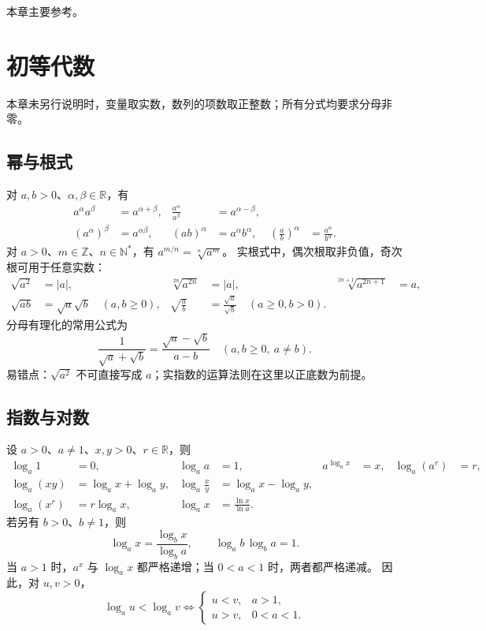 \documentclass[../main.tex]{subfiles}
\begin{document}
本章主要参考\cite{openstax,hlp}。

\section{初等代数}
本章未另行说明时，变量取实数，数列的项数取正整数；所有分式均要求分母非零。
\subsection{幂与根式}
对 $a,b>0$、$\alpha,\beta\in\mathbb R$，有
\begin{align*}
a^\alpha a^\beta&=a^{\alpha+\beta}, &
\frac{a^\alpha}{a^\beta}&=a^{\alpha-\beta},\\
(a^\alpha)^\beta&=a^{\alpha\beta}, &
(ab)^\alpha&=a^\alpha b^\alpha, &
\left(\frac ab\right)^\alpha&=\frac{a^\alpha}{b^\alpha}.
\end{align*}
对 $a>0$、$m\in\mathbb Z$、$n\in\mathbb N^*$，有 $a^{m/n}=\sqrt[n]{a^m}$。
实根式中，偶次根取非负值，奇次根可用于任意实数：
\begin{align*}
\sqrt{a^2}&=|a|, & \sqrt[2n]{a^{2n}}&=|a|, &
\sqrt[2n+1]{a^{2n+1}}&=a,\\
\sqrt{ab}&=\sqrt a\sqrt b\quad(a,b\ge0), &
\sqrt{\frac ab}&=\frac{\sqrt a}{\sqrt b}\quad(a\ge0,b>0).
\end{align*}
分母有理化的常用公式为
\[
\frac1{\sqrt a+\sqrt b}=\frac{\sqrt a-\sqrt b}{a-b}
\quad(a,b\ge0,\ a\ne b).
\]
易错点：$\sqrt{a^2}$ 不可直接写成 $a$；实指数的运算法则在这里以正底数为前提。
\subsection{指数与对数}
设 $a>0$、$a\ne1$、$x,y>0$、$r\in\mathbb R$，则
\begin{align*}
\log_a1&=0, & \log_aa&=1, & a^{\log_ax}&=x, & \log_a(a^r)&=r,\\
\log_a(xy)&=\log_ax+\log_ay, &
\log_a\frac xy&=\log_ax-\log_ay,\\
\log_a(x^r)&=r\log_ax, &
\log_ax&=\frac{\ln x}{\ln a}.
\end{align*}
若另有 $b>0$、$b\ne1$，则
\[
\log_ax=\frac{\log_bx}{\log_ba},\qquad
\log_ab\,\log_ba=1.
\]
当 $a>1$ 时，$a^x$ 与 $\log_ax$ 都严格递增；当 $0<a<1$ 时，两者都严格递减。
因此，对 $u,v>0$，
\[
\log_au<\log_av\iff
\begin{cases}u<v,&a>1,\\u>v,&0<a<1.\end{cases}
\]
\end{document}
